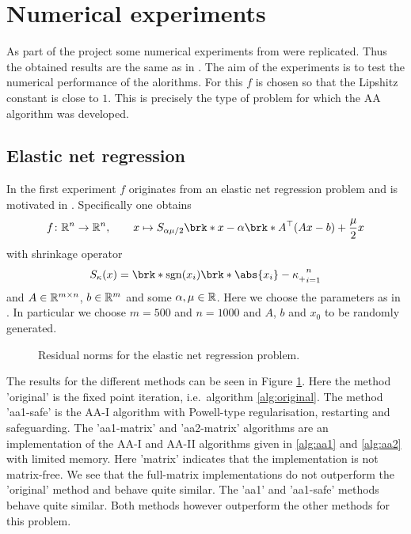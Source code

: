 \newpage
\section{Numerical experiments}

As part of the project some numerical experiments from \cite{ZhaAA} were replicated. Thus the obtained results are the same as in \cite{ZhaAA}. The aim of the experiments is to test the numerical performance of the alorithms. For this $f$ is chosen so that the Lipshitz constant is close to $1$. This is precisely the type of problem for which the AA algorithm was developed.

\subsection{Elastic net regression}

In the first experiment $f$ originates from an elastic net regression problem and is motivated in \cite[Section 5.1f]{ZhaAA}. Specifically one obtains
\begin{align*}
	f\colon\R^{n}\to\R^{n}, \qquad x\mapsto S_{\alpha\mu/2}\brk*{x-\alpha\brk*{A^\top(Ax-b)+\frac{\mu}{2}x}}
\end{align*}
with shrinkage operator
\begin{align*}
	S_\kappa(x) = \brk*{\sgn(x_i)\brk*{\abs{x_i}-\kappa}_+}_{i=1}^{n}
\end{align*}
and $A\in\mathbb{R}^{m\times n}$, $b\in\mathbb{R}^{m}$ and some $\alpha, \mu\in\mathbb{R}$. Here we choose the parameters as in \cite[Section 5.2]{ZhaAA}. In particular we choose $m=500$ and $n=1000$ and $A$, $b$ and $x_0$ to be randomly generated.

\begin{figure}
	\centering
	{\scriptsize
	
	}
	\caption{Residual norms for the elastic net regression problem.}
	\label{pl:method_comparison_ISTA}
\end{figure}

The results for the different methods can be seen in Figure \ref{pl:method_comparison_ISTA}. Here the method 'original' is the fixed point iteration, i.e.\ algorithm \ref{alg:original}. The method 'aa1-safe' is the AA-I algorithm with Powell-type regularisation, restarting and safeguarding. The 'aa1-matrix' and 'aa2-matrix' algorithms are an implementation of the AA-I and AA-II algorithms given in \ref{alg:aa1} and \ref{alg:aa2} with limited memory. Here 'matrix' indicates that the implementation is not matrix-free. We see that the full-matrix implementations do not outperform the 'original' method and behave quite similar. The 'aa1' and 'aa1-safe' methods behave quite similar. Both methods however outperform the other methods for this problem.

